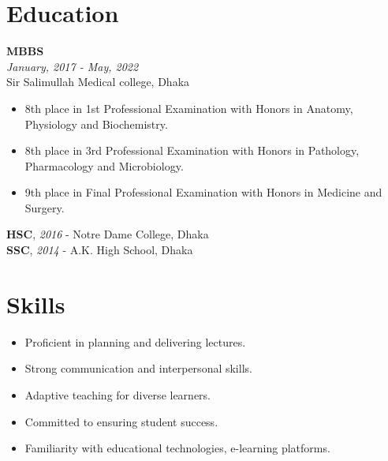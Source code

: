 \documentclass[a4paper,11pt]{article}
\newcommand{\resumeentry}[2]{
    \textbf{#1} \\
    \textit{#2}
}
\begin{document}
\begin{minipage}[t][9.4cm]{0.6\textwidth}
\raggedright
\section*{Education}
\resumeentry{MBBS}{January, 2017 - May, 2022}\\ Sir Salimullah Medical college, Dhaka
\begin{itemize}[left=0em, itemsep=0pt, parsep=0pt]
	\item 8th place in 1st Professional Examination with Honors in Anatomy, Physiology and Biochemistry.
	\item 8th place in 3rd Professional Examination with Honors in Pathology, Pharmacology and Microbiology.
	\item 9th place in Final Professional Examination with Honors in Medicine and Surgery.
\end{itemize}
\textbf{HSC}, \textit{2016} - Notre Dame College, Dhaka \\
\textbf{SSC}, \textit{2014} - A.K. High School, Dhaka \\
\end{minipage}
\hspace{0.5cm}\hspace{0.5cm}
\begin{minipage}[t][9.4cm]{0.32\textwidth}
\raggedright
\section*{Skills}
\begin{itemize}[left=0em, itemsep=0pt, parsep=0pt]
  \item Proficient in planning and delivering lectures.
  \item Strong communication and interpersonal skills.
  \item Adaptive teaching for diverse learners.
  \item Committed to ensuring student success.
  \item Familiarity with educational technologies, e-learning platforms.
\end{itemize}

\end{minipage}
\end{document}
